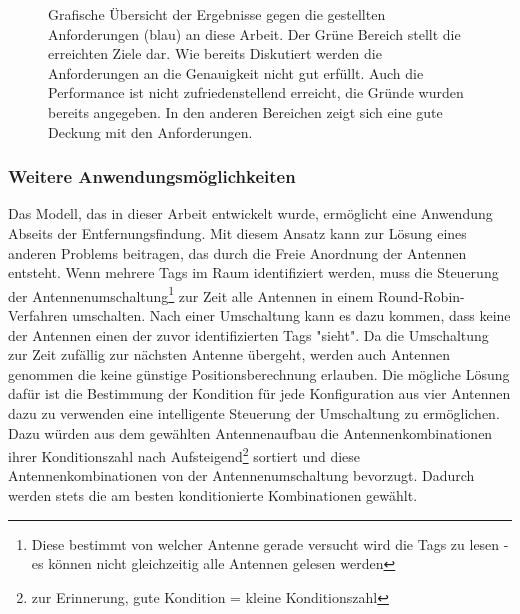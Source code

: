 \begin{figure}[ht!]
         \centering
         \caption[Anforderungsspinne]{ Grafische Übersicht der Ergebnisse gegen die gestellten Anforderungen (blau) an diese Arbeit. Der Grüne Bereich stellt die erreichten Ziele dar. Wie bereits Diskutiert werden die Anforderungen an die Genauigkeit nicht gut erfüllt. Auch die Performance ist nicht zufriedenstellend erreicht, die Gründe wurden bereits angegeben. In den anderen Bereichen zeigt sich eine gute Deckung mit den Anforderungen. }
         \vspace{2mm}
         \label{fig:Requirements_reached}
         
\end{figure}
%

\subsubsection{Weitere Anwendungsmöglichkeiten}
%
Das Modell, das in dieser Arbeit entwickelt wurde, ermöglicht eine Anwendung Abseits der Entfernungsfindung. Mit diesem Ansatz kann zur Lösung eines anderen Problems beitragen, das durch die Freie Anordnung der Antennen entsteht. Wenn mehrere Tags im Raum identifiziert werden, muss die Steuerung der Antennenumschaltung\footnote{Diese bestimmt von welcher Antenne gerade versucht wird die Tags zu lesen - es können nicht gleichzeitig alle Antennen gelesen werden} zur Zeit alle Antennen in einem Round-Robin-Verfahren umschalten. Nach einer Umschaltung kann es dazu kommen, dass keine der Antennen einen der zuvor identifizierten Tags "sieht". Da die Umschaltung zur Zeit zufällig zur nächsten Antenne übergeht, werden auch Antennen genommen die keine günstige Positionsberechnung erlauben. Die mögliche Lösung dafür ist die Bestimmung der Kondition für jede Konfiguration aus vier Antennen dazu zu verwenden eine intelligente Steuerung der Umschaltung zu ermöglichen. Dazu würden aus dem gewählten Antennenaufbau die Antennenkombinationen ihrer Konditionszahl nach Aufsteigend\footnote{zur Erinnerung, gute Kondition = kleine Konditionszahl} sortiert und diese Antennenkombinationen von der Antennenumschaltung bevorzugt. Dadurch werden stets die am besten konditionierte Kombinationen gewählt.
%

